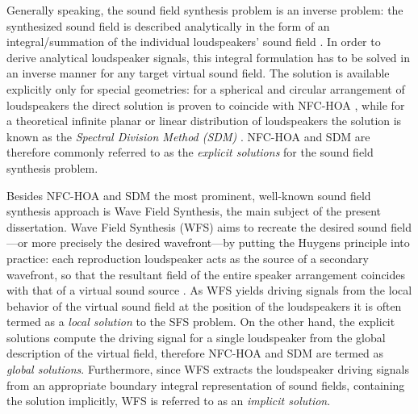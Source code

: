 Generally speaking, the sound field synthesis problem is an inverse problem: the synthesized sound field is described analytically in the form of an integral/summation of the individual loudspeakers' sound field \cite{fazi2008surround, Fazi2010, Ahrens2010phd, Ahrens2012}.
In order to derive analytical loudspeaker signals, this integral formulation has to be solved in an inverse manner for any target virtual sound field.
The solution is available explicitly only for special geometries: for a spherical and circular arrangement of loudspeakers the direct solution is proven to coincide with NFC-HOA \cite{943347, Daniel2003, poletti2005three, fazi2008surround, Ahrens2008:Analytical_Circ_Spherical_SFS, Fazi2010, Ahrens2011:icassp}, while for a theoretical infinite planar or linear distribution of loudspeakers the solution is known as the \emph{Spectral Division Method (SDM)} \cite{Fazi2010, Ahrens2010a, Ahrens2012:Ambisonics_for_planar_linear, Ahrens2012}.
NFC-HOA and SDM are therefore commonly referred to as the \emph{explicit solutions} for the sound field synthesis problem.

Besides NFC-HOA and SDM the most prominent, well-known sound field synthesis approach is Wave Field Synthesis, the main subject of the present dissertation.
Wave Field Synthesis (WFS) aims to recreate the desired sound field---or more precisely the desired wavefront---by putting the Huygens principle into practice: 
each reproduction loudspeaker acts as the source of a secondary wavefront, so that the resultant field of the entire speaker arrangement coincides with that of a virtual sound source \cite{Berkhout1993:Acoustic_control_by_WFS, Verheijen1997:phd, Ahrens2012}.
As WFS yields driving signals from the local behavior of the virtual sound field at the position of the loudspeakers it is often termed as a \emph{local solution} to the SFS problem.
On the other hand, the explicit solutions compute the driving signal for a single loudspeaker from the global description of the virtual field, therefore NFC-HOA and SDM are termed as \emph{global solutions}.
Furthermore, since WFS extracts the loudspeaker driving signals from an appropriate boundary integral representation of sound fields, containing the solution implicitly, WFS is referred to as an \emph{implicit solution}.

